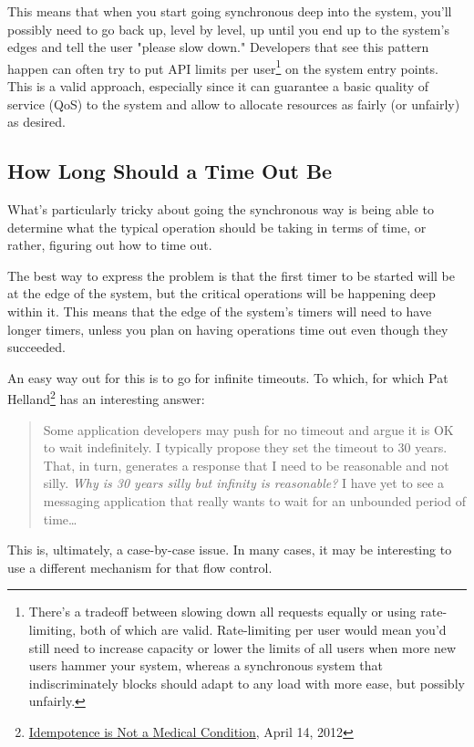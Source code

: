 \documentclass[11pt, oneside]{book}   	%
\begin{document}
This means that when you start going synchronous deep into the system, you'll possibly need to go back up, level by level, up until you end up to the system's edges and tell the user "please slow down."
Developers that see this pattern happen can often try to put API limits per user\footnote{There's a tradeoff between slowing down all requests equally or using rate-limiting, both of which are valid. Rate-limiting per user would mean you'd still need to increase capacity or lower the limits of all users when more new users hammer your system, whereas a synchronous system that indiscriminately blocks should adapt to any load with more ease, but possibly unfairly.} on the system entry points. This is a valid approach, especially since it can guarantee a basic quality of service (QoS) to the system and allow to allocate resources as fairly (or unfairly) as desired.
  
\subsection{How Long Should a Time Out Be}

What's particularly tricky about going the synchronous way is being able to determine what the typical operation should be taking in terms of time, or rather, figuring out how to time out.

The best way to express the problem is that the first timer to be started will be at the edge of the system, but the critical operations will be happening deep within it. This means that the edge of the system's timers will need to have longer timers, unless you plan on having operations time out even though they succeeded.

An easy way out for this is to go for infinite timeouts. To which, for which Pat Helland\footnote{\href{http://queue.acm.org/detail.cfm?id=2187821}{Idempotence is Not a Medical Condition}, April 14, 2012} has an interesting answer:

\begin{quote}
Some application developers may push for no timeout and argue it is OK to wait indefinitely. I typically propose they set the timeout to 30 years. That, in turn, generates a response that I need to be reasonable and not silly. \emph{Why is 30 years silly but infinity is reasonable?} I have yet to see a messaging application that really wants to wait for an unbounded period of time…
\end{quote}

This is, ultimately, a case-by-case issue. In many cases, it may be interesting to use a different mechanism for that flow control.
\end{document}
